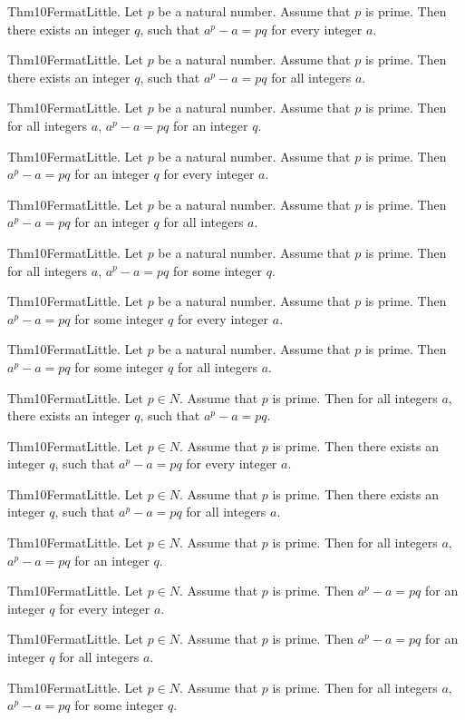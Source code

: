 \documentclass{article}
\begin{document}
Thm10FermatLittle. Let $p$ be a natural number. Assume that $p$ is prime. Then there exists an integer $q$, such that $a ^ {p}- a = p q$ for every integer $a$.

Thm10FermatLittle. Let $p$ be a natural number. Assume that $p$ is prime. Then there exists an integer $q$, such that $a ^ {p}- a = p q$ for all integers $a$.

Thm10FermatLittle. Let $p$ be a natural number. Assume that $p$ is prime. Then for all integers $a$, $a ^ {p}- a = p q$ for an integer $q$.

Thm10FermatLittle. Let $p$ be a natural number. Assume that $p$ is prime. Then $a ^ {p}- a = p q$ for an integer $q$ for every integer $a$.

Thm10FermatLittle. Let $p$ be a natural number. Assume that $p$ is prime. Then $a ^ {p}- a = p q$ for an integer $q$ for all integers $a$.

Thm10FermatLittle. Let $p$ be a natural number. Assume that $p$ is prime. Then for all integers $a$, $a ^ {p}- a = p q$ for some integer $q$.

Thm10FermatLittle. Let $p$ be a natural number. Assume that $p$ is prime. Then $a ^ {p}- a = p q$ for some integer $q$ for every integer $a$.

Thm10FermatLittle. Let $p$ be a natural number. Assume that $p$ is prime. Then $a ^ {p}- a = p q$ for some integer $q$ for all integers $a$.

Thm10FermatLittle. Let $p \in N$. Assume that $p$ is prime. Then for all integers $a$, there exists an integer $q$, such that $a ^ {p}- a = p q$.

Thm10FermatLittle. Let $p \in N$. Assume that $p$ is prime. Then there exists an integer $q$, such that $a ^ {p}- a = p q$ for every integer $a$.

Thm10FermatLittle. Let $p \in N$. Assume that $p$ is prime. Then there exists an integer $q$, such that $a ^ {p}- a = p q$ for all integers $a$.

Thm10FermatLittle. Let $p \in N$. Assume that $p$ is prime. Then for all integers $a$, $a ^ {p}- a = p q$ for an integer $q$.

Thm10FermatLittle. Let $p \in N$. Assume that $p$ is prime. Then $a ^ {p}- a = p q$ for an integer $q$ for every integer $a$.

Thm10FermatLittle. Let $p \in N$. Assume that $p$ is prime. Then $a ^ {p}- a = p q$ for an integer $q$ for all integers $a$.

Thm10FermatLittle. Let $p \in N$. Assume that $p$ is prime. Then for all integers $a$, $a ^ {p}- a = p q$ for some integer $q$.
\end{document}
